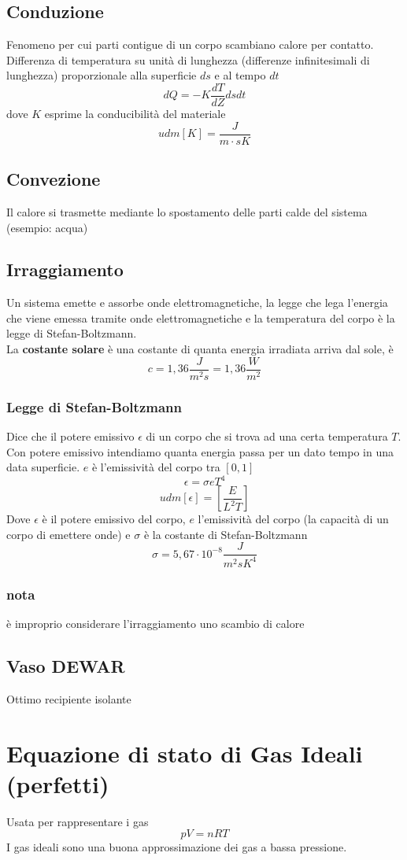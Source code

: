 \documentclass[a4paper]{report}
\begin{document}
  \subsection{Conduzione}
  Fenomeno per cui parti contigue di un corpo scambiano calore per contatto. Differenza di temperatura su unità di lunghezza (differenze infinitesimali di lunghezza) proporzionale alla superficie $ds$ e al tempo $dt$
  $$ dQ = -K \frac{dT}{dZ} ds dt $$
  dove $K$ esprime la conducibilità del materiale
  $$ udm[K] = \frac{J}{m\cdot sK} $$
  \subsection{Convezione}
  Il calore si trasmette mediante lo spostamento delle parti calde del sistema (esempio: acqua)
  \subsection{Irraggiamento}
  Un sistema emette e assorbe onde elettromagnetiche, la legge che lega l'energia che viene emessa tramite onde elettromagnetiche e la temperatura del corpo è la legge di Stefan-Boltzmann.\\
  La \textbf{costante solare} è una costante di quanta energia irradiata arriva dal sole, è
  $$c = 1,36 \frac{J}{m^2 s}= 1,36 \frac{W}{m^2}$$
  \subsubsection{Legge di Stefan-Boltzmann}
  Dice che il potere emissivo $\epsilon$ di un corpo che si trova ad una certa temperatura $T$. Con potere emissivo intendiamo quanta energia passa per un dato tempo in una data superficie. $e$ è l'emissività del corpo tra $[0,1]$
  $$\epsilon = \sigma e T^4$$
  $$ udm[\epsilon] = [\frac{E}{L^2T}] $$
  Dove $\epsilon$ è il potere emissivo del corpo, $e$ l'emissività del corpo (la capacità di un corpo di emettere onde) e $\sigma$ è la costante di Stefan-Boltzmann
  $$ \sigma = 5,67 \cdot 10^{-8} \frac{J}{m^2sK^4} $$
  \subsubsection{nota}
  è improprio considerare l'irraggiamento uno scambio di calore
  \subsection{Vaso DEWAR}
  Ottimo recipiente isolante

  \section{Equazione di stato di Gas Ideali (perfetti)}
  Usata per rappresentare i gas
  $$ pV = nRT $$
  I gas ideali sono una buona approssimazione dei gas a bassa pressione.
\end{document}
